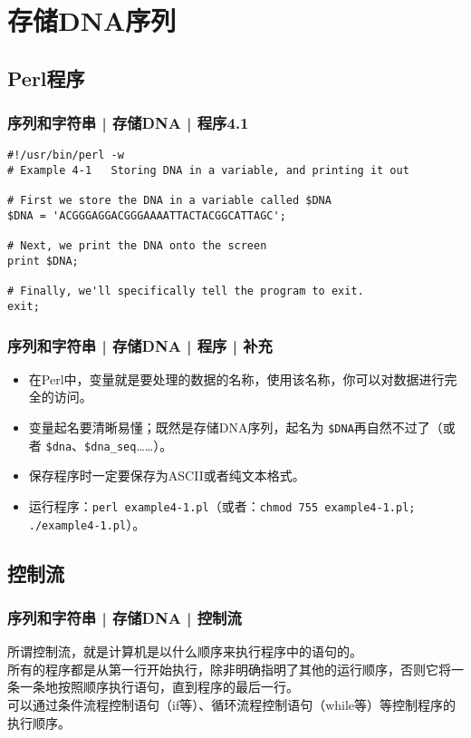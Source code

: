 \section{存储DNA序列}
\subsection{Perl程序}
\begin{frame}[fragile,label=exam4.1]
  \frametitle{序列和字符串 | 存储DNA | \alert{程序4.1}}
\begin{lstlisting}
#!/usr/bin/perl -w
# Example 4-1   Storing DNA in a variable, and printing it out

# First we store the DNA in a variable called $DNA
$DNA = 'ACGGGAGGACGGGAAAATTACTACGGCATTAGC';

# Next, we print the DNA onto the screen
print $DNA;

# Finally, we'll specifically tell the program to exit.
exit;
\end{lstlisting}
\end{frame}

\begin{frame}[fragile]
  \frametitle{序列和字符串 | 存储DNA | 程序 | \alert{补充}}
  \begin{itemize}
    \item 在Perl中，变量就是要处理的数据的名称，使用该名称，你可以对数据进行完全的访问。
    \item 变量起名要清晰易懂；既然是存储DNA序列，起名为 \verb|$DNA|再自然不过了（或者 \verb|$dna|、\verb|$dna_seq|……）。
    \item 保存程序时一定要保存为ASCII或者纯文本格式。
    \item 运行程序：\verb|perl example4-1.pl|（或者：\verb|chmod 755 example4-1.pl; ./example4-1.pl|）。
  \end{itemize}
\end{frame}

\subsection{控制流}
\begin{frame}
  \frametitle{序列和字符串 | 存储DNA | 控制流}
  所谓控制流，就是计算机是以什么顺序来执行程序中的语句的。\\
  \vspace{1em}
  所有的程序都是从第一行开始执行，除非明确指明了其他的运行顺序，否则它将一条一条地按照顺序执行语句，直到程序的最后一行。\\
  \vspace{1em}
  可以通过条件流程控制语句（if等）、循环流程控制语句（while等）等控制程序的执行顺序。
\end{frame}

